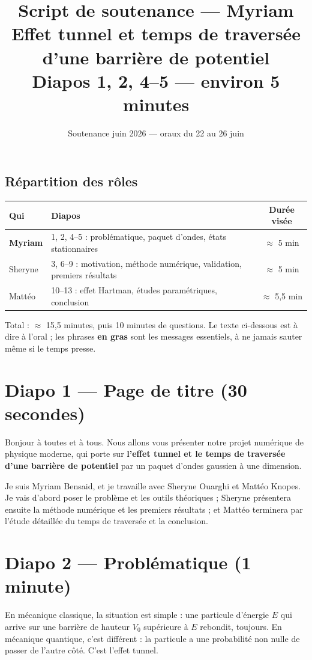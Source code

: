 \documentclass[11pt,a4paper]{article}
\title{\textbf{Script de soutenance --- Myriam}\\
	\large Effet tunnel et temps de traversée d'une barrière de potentiel\\
	\normalsize Diapos 1, 2, 4--5 --- environ 5 minutes}
\author{}
\date{Soutenance juin 2026 --- oraux du 22 au 26 juin}
\newcommand{\diapo}[2]{\section*{Diapo #1 --- #2}}
\begin{document}
	\maketitle
	
	\subsection*{Répartition des rôles}
	
	\begin{center}
		\begin{tabular}{llc}
			\toprule
			Qui & Diapos & Durée visée \\
			\midrule
			\textbf{Myriam} & 1, 2, 4--5 : problématique, paquet d'ondes, états stationnaires & $\approx$ 5 min \\
			Sheryne & 3, 6--9 : motivation, méthode numérique, validation, premiers résultats & $\approx$ 5 min \\
			Mattéo & 10--13 : effet Hartman, études paramétriques, conclusion & $\approx$ 5,5 min \\
			\bottomrule
		\end{tabular}
	\end{center}
	
	Total : $\approx$ 15,5 minutes, puis 10 minutes de questions. Le texte ci-dessous est à dire
	à l'oral ; les phrases \textbf{en gras} sont les messages essentiels, à ne jamais
	sauter même si le temps presse.
	
	\diapo{1}{Page de titre (30 secondes)}
	
	Bonjour à toutes et à tous. Nous allons vous présenter notre projet numérique de
	physique moderne, qui porte sur \textbf{l'effet tunnel et le temps de traversée
		d'une barrière de potentiel} par un paquet d'ondes gaussien à une dimension.
	
	Je suis Myriam Bensaid, et je travaille avec Sheryne Ouarghi et Mattéo Knopes.
	Je vais d'abord poser le problème et les outils théoriques ; Sheryne présentera
	ensuite la méthode numérique et les premiers résultats ; et Mattéo terminera par
	l'étude détaillée du temps de traversée et la conclusion.
	
	\diapo{2}{Problématique (1 minute)}
	
	En mécanique classique, la situation est simple : une particule d'énergie $E$
	qui arrive sur une barrière de hauteur $V_0$ supérieure à $E$ rebondit, toujours.
	En mécanique quantique, c'est différent : la particule a une probabilité non
	nulle de passer de l'autre côté. C'est l'effet tunnel.
	
\end{document}

